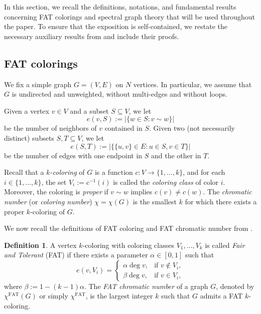 \documentclass{article}
\theoremstyle{plain}
\theoremstyle{definition}
\newtheorem{definition}[theorem]{Definition}
\theoremstyle{remark}
\begin{document}
In this section, we recall the definitions, notations, and fundamental results concerning FAT colorings and spectral graph theory that will be used throughout the paper. To ensure that the exposition is self-contained, we restate the necessary auxiliary results from \cite{beersmulasFAT} and include their proofs. 


\subsection{FAT colorings}
We fix a simple graph $G = (V, E)$ on $N$ vertices. In particular, we assume that $G$ is undirected and unweighted, without multi-edges and without loops.\newline 


Given a vertex $v\in V$ and a subset $S\subseteq V$, we let
$$
e(v,S) := |\{w\in S : v\sim w\}|
$$
be the number of neighbors of $v$ contained in $S$. Given two (not necessarily distinct) subsets $S,T\subseteq V$, we let
$$
e(S,T) := |\{\{u,v\}\in E : u\in S, v\in T\}|
$$
be the number of edges with one endpoint in $S$ and the other in $T$.\newline 

Recall that a \emph{$k$-coloring} of $G$ is a function $c:V\to \{1,\ldots,k\}$, and for each $i\in\{1,\ldots,k\}$, the set $V_i := c^{-1}(i)$ is called the \emph{coloring class} of color $i$. Moreover, the coloring is \emph{proper} if $v\sim w$ implies $c(v)\neq c(w)$. The \emph{chromatic number} (or \emph{coloring number}) $\chi=\chi(G)$ is the smallest $k$ for which there exists a proper $k$-coloring of $G$.\newline 

We now recall the definitions of FAT coloring and FAT chromatic number from \cite{beersmulasFAT}.


\begin{definition}\label{def:FAT}
    A vertex $k$-coloring with coloring classes $V_1,\ldots,V_k$ is called \emph{Fair and Tolerant} (FAT) if there exists a parameter $\alpha\in [0,1]$ such that
    \[
    e(v,V_i)=
    \begin{cases}
        \alpha \deg v, & \text{if } v\notin V_i,\\[2mm]
        \beta \deg v, & \text{if } v\in V_i,
    \end{cases}
    \]
    where $\beta := 1 - (k-1)\alpha$.  The  \emph{FAT chromatic number} of a graph $G$, denoted by $\chi^{\textrm{FAT}}(G)$ or simply $\chi^{\textrm{FAT}}$, is the largest integer $k$ such that  $G$ admits a FAT $k$-coloring. 
\end{definition}
\end{document}
